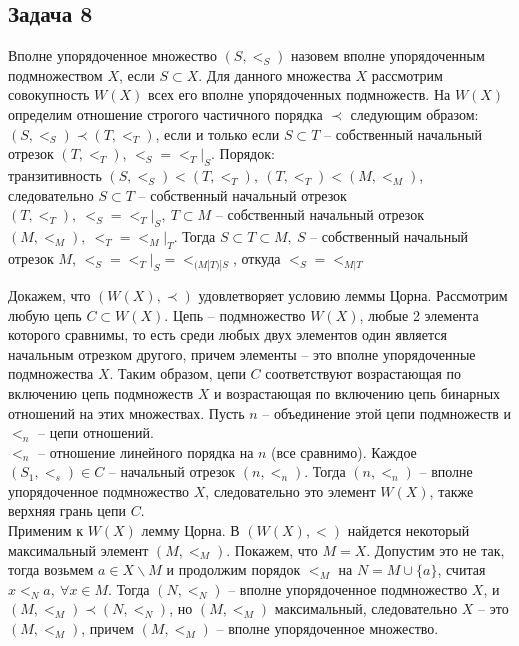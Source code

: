 \subsection*{Задача 8}
	Вполне упорядоченное множество $(S, <_{S})$ назовем вполне упорядоченным подмножеством $X$, если $S \subset X$. Для данного множества $X$ рассмотрим совокупность $W(X)$ всех его вполне упорядоченных подмножеств. На $W(X)$ определим отношение строгого частичного порядка $\prec$ следующим образом:\\
	$(S, <_{S}) \prec (T, <_{T})$, если и только если $S \subset T$ -- собственный начальный отрезок $(T, <_{T})$, $<_S = <_T|_S$.
	\vskip 0.1in
	Порядок:\\
	транзитивность $(S,<_S) < (T, <_T),\ (T, <_T) < (M, <_M)$, следовательно $S \subset T$ -- собственный начальный отрезок $(T, <_T),\ <_S = <_T|_S,\ T \subset M$ -- собственный начальный отрезок $(M, <_M),\ <_T = <_M|_T$. Тогда $S \subset T \subset M,\ S$ -- собственный начальный отрезок $M$, $<_S = <_T|_S = <_{(M|T)|S}$, откуда $<_S = <_{M|T}$\\

	\vskip 0.1in

	Докажем, что $(W(X), \prec)$ удовлетворяет условию леммы Цорна. Рассмотрим любую цепь $C \subset W(X)$. Цепь -- подмножество $W(X)$, любые 2 элемента которого сравнимы, то есть среди любых двух элементов один является начальным отрезком другого, причем элементы -- это вполне упорядоченные подмножества $X$. Таким образом, цепи $C$ соответствуют возрастающая по включению цепь подмножеств $X$ и возрастающая по включению цепь бинарных отношений на этих множествах. Пусть $n$ -- объединение этой цепи подмножеств и $<_n$ -- цепи отношений.\\
	$<_n$ -- отношение линейного порядка на $n$ (все сравнимо). Каждое $(S_1, <_s) \in C$ -- начальный отрезок $(n, <_n)$. Тогда $(n, <_n)$ -- вполне упорядоченное подмножество $X$, следовательно это элемент $W(X)$,  также верхняя грань цепи $C$.\\
	Применим к $W(X)$ лемму Цорна. В $(W(X), <)$ найдется некоторый максимальный элемент $(M, <_M)$. Покажем, что $M = X$. Допустим это не так, тогда возьмем $a \in X \backslash M$ и продолжим порядок $<_M$ на $N = M \cup \{a\}$, считая $x <_N a,\ \forall x \in M$. Тогда $(N, <_N)$ -- вполне упорядоченное подмножество $X$, и $(M, <_M) \prec (N, <_N)$, но $(M, <_M)$ максимальный, следовательно $X$ -- это $(M, <_M)$, причем $(M, <_M)$ -- вполне упорядоченное множество. 

